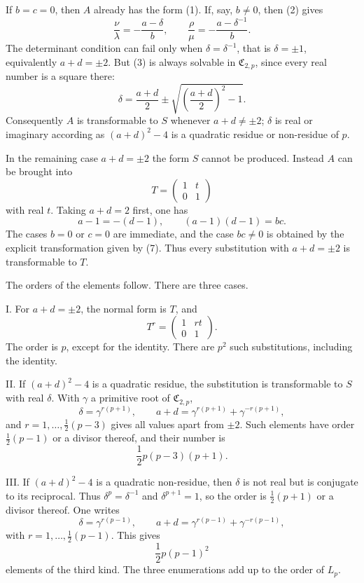 \documentclass[11pt]{article}
\providecommand{\mat}[4]{\begin{pmatrix}#1&#2\\#3&#4\end{pmatrix}}
\providecommand{\mat}[4]{\begin{pmatrix}#1&#2\\#3&#4\end{pmatrix}}
\providecommand{\Cfield}{\mathfrak C}
\providecommand{\mat}[1]{\begin{pmatrix}#1\end{pmatrix}}
\begin{document}
If $b=c=0$, then $A$ already has the form (1). If, say, $b\ne0$, then (2) gives
\begin{equation}
 \frac{\nu}{\lambda}=-\frac{a-\delta}{b},\qquad
 \frac{\rho}{\mu}=-\frac{a-\delta^{-1}}{b}.
 \tag{4}
\end{equation}
The determinant condition can fail only when $\delta=\delta^{-1}$, that is $\delta=\pm1$, equivalently $a+d=\pm2$. But (3) is always solvable in $\Cfield_{2,p}$, since every real number is a square there:
\begin{equation}
 \delta=\frac{a+d}{2}\pm \sqrt{\left(\frac{a+d}{2}\right)^2-1}.
 \tag{5}
\end{equation}
Consequently $A$ is transformable to $S$ whenever $a+d\ne\pm2$; $\delta$ is real or imaginary according as $(a+d)^2-4$ is a quadratic residue or non-residue of $p$.

In the remaining case $a+d=\pm2$ the form $S$ cannot be produced. Instead $A$ can be brought into
\begin{equation}
 T=\mat{1}{t}{0}{1}
 \tag{6}
\end{equation}
with real $t$. Taking $a+d=2$ first, one has
\begin{equation}
 a-1=-(d-1),\qquad (a-1)(d-1)=bc.
 \tag{7}
\end{equation}
The cases $b=0$ or $c=0$ are immediate, and the case $bc\ne0$ is obtained by the explicit transformation given by (7). Thus every substitution with $a+d=\pm2$ is transformable to $T$.

The orders of the elements follow. There are three cases.

I. For $a+d=\pm2$, the normal form is $T$, and
\[
 T^r=\mat{1}{rt}{0}{1}.
\]
The order is $p$, except for the identity. There are $p^2$ such substitutions, including the identity.

II. If $(a+d)^2-4$ is a quadratic residue, the substitution is transformable to $S$ with real $\delta$. With $\gamma$ a primitive root of $\Cfield_{2,p}$,
\begin{equation}
 \delta=\gamma^{r(p+1)},\qquad
 a+d=\gamma^{r(p+1)}+\gamma^{-r(p+1)},
 \tag{8}
\end{equation}
and $r=1,\ldots,\frac12(p-3)$ gives all values apart from $\pm2$. Such elements have order $\frac12(p-1)$ or a divisor thereof, and their number is
\[
 \frac12p(p-3)(p+1).
\]

III. If $(a+d)^2-4$ is a quadratic non-residue, then $\delta$ is not real but is conjugate to its reciprocal. Thus $\delta^p=\delta^{-1}$ and $\delta^{p+1}=1$, so the order is $\frac12(p+1)$ or a divisor thereof. One writes
\begin{equation}
 \delta=\gamma^{r(p-1)},\qquad
 a+d=\gamma^{r(p-1)}+\gamma^{-r(p-1)},
 \tag{9}
\end{equation}
with $r=1,\ldots,\frac12(p-1)$. This gives
\[
 \frac12p(p-1)^2
\]
elements of the third kind. The three enumerations add up to the order of $L_p$.
\end{document}
